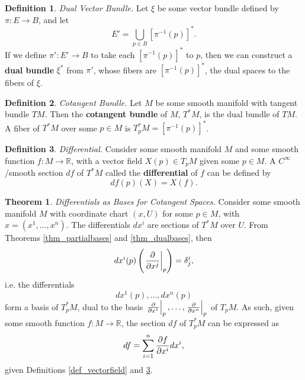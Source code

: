 \documentclass[10pt,landscape]{article}
\theoremstyle{definition}
\newtheorem{definition}{Definition}[section]
\theoremstyle{theorem}
\newtheorem{theorem}{Theorem}[section]
\theoremstyle{summary}
\theoremstyle{remark}
\newcommand{\R}{\mathbb{R}}
\newcommand{\Ci}{C^\infty}
\begin{document}
\begin{multicols*}{3}
\theoremstyle{definition}
\begin{definition}{\textit{Dual Vector Bundle.}}
    Let $\xi$ be some vector bundle defined by $\pi: E\rightarrow B$, and let
    \begin{equation}
        E'=\bigcup\limits_{p\in B}\left[\pi^{-1}(p)\right]^*.
    \end{equation}
    If we define $\pi':E'\rightarrow B$ to take each $\left[\pi^{-1}(p)\right]^*$ to $p$, then we can construct a \textbf{dual bundle} $\xi^*$ from $\pi'$, whose fibers are $\left[\pi^{-1}(p)\right]^*$, the dual spaces to the fibers of $\xi$.
\end{definition}

\theoremstyle{definition}
\begin{definition}{\textit{Cotangent Bundle.}}
    Let $M$ be some smooth manifold with tangent bundle $TM$. Then the \textbf{cotangent bundle} of $M$, $T^*M$, is the dual bundle of $TM$. A fiber of $T^*M$ over some $p\in M$ is $T_p^*M = \left[\pi^{-1}(p)\right]^*$.
\end{definition}

\theoremstyle{definition}
\begin{definition}{\textit{Differential.}}
\label{def_differential}
    Consider some smooth manifold $M$ and some smooth function $f:M\rightarrow \R$, with a vector field $X(p)\in T_pM$ given some $p\in M$. A $\Ci$/smooth section $df$ of $T^*M$ called the \textbf{differential} of $f$ can be defined by
    \begin{equation}
        df(p)(X) = X(f).
    \end{equation}
\end{definition}

\theoremstyle{theorem}
\begin{theorem}{\textit{Differentials as Bases for Cotangent Spaces.}}
    Consider some smooth manifold $M$ with coordinate chart $(x, U)$ for some $p\in M$, with $x = (x^1,\ldots,x^n)$. The differentials $dx^i$ are sections of $T^*M$ over $U$.
    From Theorems \ref{thm_partialbases} and \ref{thm_dualbases}, then 
    \begin{equation}
        dx^i(p)\left(\displaystyle\left.\pdv{}{x^j}\right|_p\right) = \delta_j^i,
    \end{equation}
    i.e. the differentials
    \begin{equation}
        dx^1(p), \ldots, dx^n(p)
    \end{equation}
    form a basis of $T^*_pM$, dual to the basis $\left.\pdv{}{x^1}\right|_p,\ldots,\left.\pdv{}{x^n}\right|_p$ of $T_pM$. As such, given some smooth function $f:M\rightarrow \R$, the section $df$ of $T^*_pM$ can be expressed as
    \begin{equation}
        df = \sum\limits_{i=1}^n\pdv{f}{x^i}dx^i,
    \end{equation}
    given Definitions \ref{def_vectorfield} and \ref{def_differential}.
\end{theorem}


\end{multicols*}
\end{document}
